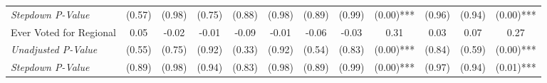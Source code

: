 \begin{tabular}{l c c c c c c c c c c c}
\quad \textit{Stepdown P-Value} & (0.57) & (0.98) & (0.75) & (0.88) & (0.98) & (0.89) & (0.99) & (0.00)*** & (0.96) & (0.94) & (0.00)*** \\
Ever Voted for Regional & 0.05 & -0.02 & -0.01 & -0.09 & -0.01 & -0.06 & -0.03 & 0.31 & 0.03 & 0.07 & 0.27 \\
\quad \textit{Unadjusted P-Value} & (0.55) & (0.75) & (0.92) & (0.33) & (0.92) & (0.54) & (0.83) & (0.00)*** & (0.84) & (0.59) & (0.00)*** \\
\quad \textit{Stepdown P-Value} & (0.89) & (0.98) & (0.94) & (0.83) & (0.98) & (0.89) & (0.99) & (0.00)*** & (0.97) & (0.94) & (0.01)*** \\
\bottomrule
\end{tabular}
